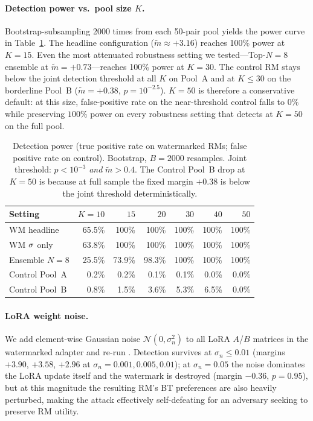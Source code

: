 \paragraph{Detection power vs.\ pool size $K$.}
Bootstrap-subsampling 2000 times from each 50-pair pool yields the
power curve in Table~\ref{tab:roc-K}. The headline configuration
($\tilde{m}{\approx}+3.16$) reaches 100\% power at $K{=}15$. Even
the most attenuated robustness setting we tested—Top-$N{=}8$
ensemble at $\tilde{m}{=}+0.73$—reaches 100\% power at $K{=}30$.
The control RM stays below the joint detection threshold at all $K$
on Pool~A and at $K{\le}30$ on the borderline Pool~B
($\tilde{m}{=}+0.38$, $p{=}10^{-2.5}$). $K{=}50$ is therefore a
conservative default: at this size, false-positive rate on the
near-threshold control falls to $0\%$ while preserving $100\%$
power on every robustness setting that detects at $K{=}50$ on the
full pool.

\begin{table}[h]
\centering
\small
\begin{tabular}{lrrrrrr}
\toprule
Setting & $K{=}10$ & $15$ & $20$ & $30$ & $40$ & $50$ \\
\midrule
WM headline      & 65.5\% & 100\% & 100\% & 100\% & 100\% & 100\% \\
WM $\sigma$ only        & 63.8\% & 100\% & 100\% & 100\% & 100\% & 100\% \\
Ensemble $N{=}8$ & 25.5\% & 73.9\% & 98.3\% & 100\% & 100\% & 100\% \\
\midrule
Control Pool~A   &  0.2\% &  0.2\% &  0.1\% &  0.1\% &  0.0\% &  0.0\% \\
Control Pool~B   &  0.8\% &  1.5\% &  3.6\% &  5.3\% &  6.5\% &  0.0\% \\
\bottomrule
\end{tabular}
\caption{Detection power (true positive rate on watermarked RMs;
false positive rate on control). Bootstrap, $B{=}2000$ resamples.
Joint threshold: $p<10^{-3}$ \emph{and} $\tilde{m}>0.4$. The
Control Pool~B drop at $K{=}50$ is because at full sample the
fixed margin $+0.38$ is below the joint threshold deterministically.}
\label{tab:roc-K}
\end{table}

\paragraph{LoRA weight noise.}
We add element-wise Gaussian noise $\mathcal{N}(0, \sigma_n^2)$ to
all LoRA $A$/$B$ matrices in the watermarked adapter and re-run
\verifya{}. Detection survives at $\sigma_n \le 0.01$
(margins $+3.90$, $+3.58$, $+2.96$ at $\sigma_n = 0.001, 0.005,
0.01$); at $\sigma_n = 0.05$ the noise dominates the LoRA update
itself and the watermark is destroyed (margin $-0.36$, $p=0.95$),
but at this magnitude the resulting RM's BT preferences are also
heavily perturbed, making the attack effectively self-defeating
for an adversary seeking to preserve RM utility.

